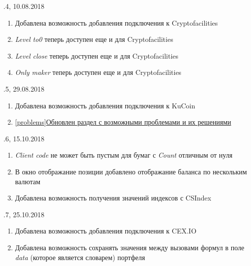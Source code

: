 \vspace{5mm}

.4, 10.08.2018
\begin{enumerate}
	\item Добавлена возможность добавления подключения к Cryptofacilities
	\item \textit{Level to0} теперь доступен еще и для Cryptofacilities
	\item \textit{Level close} теперь доступен еще и для Cryptofacilities
	\item \textit{Only maker} теперь доступен еще и для Cryptofacilities
\end{enumerate}

\vspace{5mm}

.5, 29.08.2018
\begin{enumerate}
	\item Добавлена возможность добавления подключения к KuCoin
	\item \hyperref[problems]{\ref{problems}Обновлен раздел с возможными проблемами и их решениями}
\end{enumerate}

\vspace{5mm}

.6, 15.10.2018
\begin{enumerate}
	\item \textit{Client code} не может быть пустым для бумаг с \textit{Count} отличным от нуля
	\item В окно отображание позиции добавлено отображание баланса по нескольким валютам
	\item Добавлена возможность получения значений индексов с CSIndex
\end{enumerate}

\vspace{5mm}

.7, 25.10.2018
\begin{enumerate}
	\item Добавлена возможность добавления подключения к CEX.IO
	\item Добавлена возможность сохранять значения между вызовами формул в поле \textit{data} (которое является словарем) портфеля
\end{enumerate}

